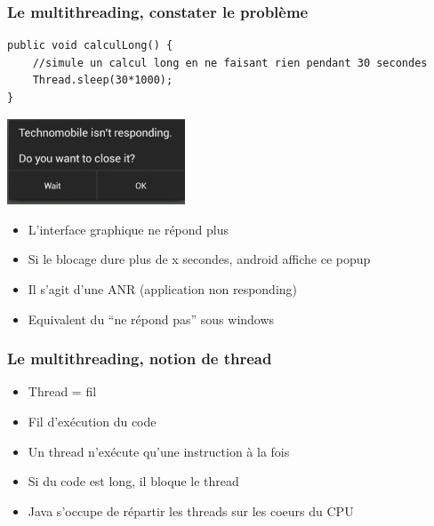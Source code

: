 \documentclass{beamer}
\begin{document}
\begin{frame}[fragile] 
\frametitle{Le multithreading, constater le problème}
\begin{lstlisting}
public void calculLong() {
    //simule un calcul long en ne faisant rien pendant 30 secondes
    Thread.sleep(30*1000);
}
\end{lstlisting}
\includegraphics[width=150pt]{img/anr.png}
\begin{itemize}
  \item L'interface graphique ne répond plus
  \item Si le blocage dure plus de x secondes, android affiche ce popup
  \item Il s'agit d'une ANR (application non responding)
  \item Equivalent du ``ne répond pas'' sous windows
\end{itemize}
\end{frame}

\begin{frame}[fragile] 
\frametitle{Le multithreading, notion de thread}
\begin{itemize}
  \item Thread = fil
  \item Fil d'exécution du code
  \item Un thread n'exécute qu'une instruction à la fois
  \item Si du code est long, il bloque le thread
  \item Java s'occupe de répartir les threads sur les coeurs du CPU
\end{itemize}
\end{frame}
\end{document}
